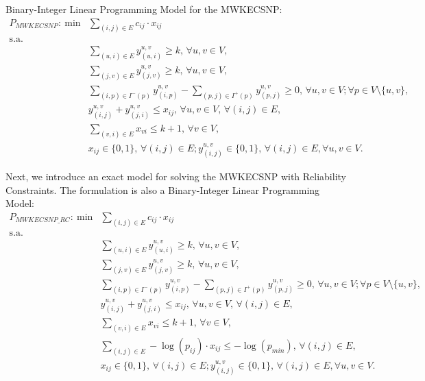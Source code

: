 Binary-Integer Linear Programming Model for the MWKECSNP:
\begin{align}
 P_{MWKECSNP}:~ \mathrm{min} &  \sum_{(i,j)\in E} c_{ij}\cdot x_{ij}   \nonumber\\
 \mathrm{s.a.} & \nonumber\\
 &                  \sum_{(u,i)\in E} y_{(u,i)}^{u,v}\geq k,\, \forall u,v\in V, & \nonumber &\\
 &                  \sum_{(j,v)\in E} y_{(j,v)}^{u,v}\geq k,\, \forall u,v\in V, & \nonumber &\\
 &                  \sum_{(i,p)\in I^{-}(p)} y_{(i,p)}^{u,v}-\sum_{(p,j)\in I^{+}(p)} y_{(p,j)}^{u,v} \geq 0,\, \forall u,v\in V; \forall p\in V\setminus \{u,v\},  & \nonumber &\\
 &                   y_{(i,j)}^{u,v}+y_{(j,i)}^{u,v}\leq x_{ij},\, \forall u,v\in V,\, \forall (i,j)\in E,  & \nonumber &\\
 &                  \sum_{(v,i)\in E} x_{vi}\leq k+1,\, \forall v\in V,  & \nonumber &\\
 &                  x_{ij}\in \{0,1\},\, \forall (i,j)\in E; y_{(i,j)}^{u,v}\in \{0,1\},\, \forall (i,j)\in E, \forall u,v\in V.   & \nonumber &
\end{align}

Next, we introduce an exact model for solving the MWKECSNP with
Reliability Constraints. The formulation is also a Binary-Integer Linear Programming Model:
\begin{align}
 P_{MWKECSNP\_RC}:~ \mathrm{min} &  \sum_{(i,j)\in E} c_{ij}\cdot x_{ij}   \nonumber\\
 \mathrm{s.a.} & \nonumber\\
 &                  \sum_{(u,i)\in E} y_{(u,i)}^{u,v}\geq k,\, \forall u,v\in V, & \nonumber &\\
 &                  \sum_{(j,v)\in E} y_{(j,v)}^{u,v}\geq k,\, \forall u,v\in V, & \nonumber &\\
 &                  \sum_{(i,p)\in I^{-}(p)} y_{(i,p)}^{u,v}-\sum_{(p,j)\in I^{+}(p)} y_{(p,j)}^{u,v} \geq 0,\, \forall u,v\in V; \forall p\in V\setminus \{u,v\},  & \nonumber &\\
 &                   y_{(i,j)}^{u,v}+y_{(j,i)}^{u,v}\leq x_{ij},\, \forall u,v\in V,\, \forall (i,j)\in E,  & \nonumber &\\
 &                  \sum_{(v,i)\in E} x_{vi}\leq k+1,\, \forall v\in V,  & \nonumber &\\
 &                  \sum_{(i,j)\in E} -\log(p_{ij})\cdot x_{ij}\leq -\log(p_{min}),\, \forall (i,j)\in E,  & \nonumber &\\
 &                  x_{ij}\in \{0,1\},\, \forall (i,j)\in E; y_{(i,j)}^{u,v}\in \{0,1\},\, \forall (i,j)\in E, \forall u,v\in V.   & \nonumber &
\end{align}

